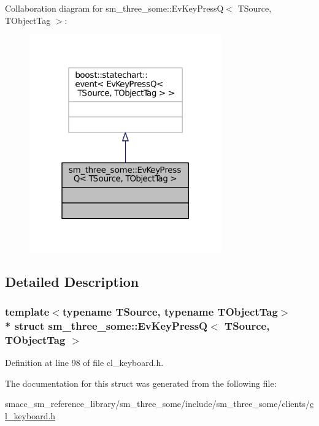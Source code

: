 Collaboration diagram for sm\+\_\+three\+\_\+some\+:\+:Ev\+Key\+PressQ$<$ T\+Source, T\+Object\+Tag $>$\+:
\nopagebreak
\begin{figure}[H]
\begin{center}
\leavevmode
\includegraphics[width=235pt]{structsm__three__some_1_1EvKeyPressQ__coll__graph}
\end{center}
\end{figure}


\subsection{Detailed Description}
\subsubsection*{template$<$typename T\+Source, typename T\+Object\+Tag$>$\\*
struct sm\+\_\+three\+\_\+some\+::\+Ev\+Key\+Press\+Q$<$ T\+Source, T\+Object\+Tag $>$}



Definition at line 98 of file cl\+\_\+keyboard.\+h.



The documentation for this struct was generated from the following file\+:\begin{DoxyCompactItemize}
\item 
smacc\+\_\+sm\+\_\+reference\+\_\+library/sm\+\_\+three\+\_\+some/include/sm\+\_\+three\+\_\+some/clients/\hyperlink{cl__keyboard_8h}{cl\+\_\+keyboard.\+h}\end{DoxyCompactItemize}
